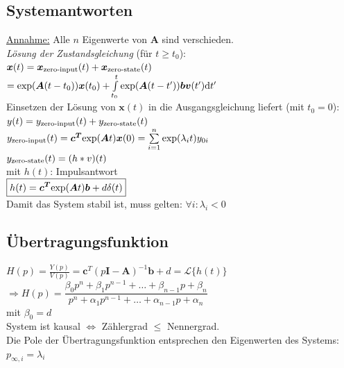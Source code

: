 \documentclass[a4paper,landscape,6pt]{article}
\newcommand{\ma}[1]{\ensuremath{\boldsymbol {#1}}}								%
\renewcommand{\vec}[1]{\ensuremath{\boldsymbol {#1}}}							%
\newcommand{\ul}[1]{\underline{#1}}
\begin{document}
\begin{multicols}{3}
\begin{tabular}{ll}
\end{tabular}

\subsection*{Systemantworten}
\ul{Annahme:} Alle $n$ Eigenwerte von $\ma A$ sind verschieden.\\

\textit{Lösung der Zustandsgleichung} (für $t \ge t_0$):\\
$\vec x (t) =  \vec x_{\textmd{zero-input}}(t) + \vec x_{\textmd{zero-state}}(t)$ \\
$= \textmd{exp}(\ma A (t-t_0)) \vec x (t_0) + \int\limits_{t_0}^t \textmd{exp}(\ma A(t-t')) \vec b \vec v(t') \mathrm{d}t'$\\

Einsetzen der Lösung von $\vec x(t)$ in die Ausgangsgleichung liefert (mit $t_0 = 0$):\\
$y(t) = y_{\textmd{zero-input}}(t) + y_{\textmd{zero-state}}(t)$\\
$y_{\textmd{zero-input}}(t) = \ma{c^T} \textmd{exp}(\ma A t) \vec x (0) = \sum\limits_{i=1}^{n} \textmd{exp}(\lambda_i t) y_{0i}$\\
$y_{\textmd{zero-state}}(t) = (h*v)(t)$\\

mit $h(t)$: Impulsantwort\\
$\boxed{h(t) = \vec c^{\ma T} \textmd{exp}(\ma A t) \vec b + d\delta(t)}$\\

Damit das System stabil ist, muss gelten: $\forall i : \lambda_i < 0$\\

\subsection*{Übertragungsfunktion}
$H(p) = \frac{Y(p)}{V(p)} = \ma{c}^T (p\ma{I} - \ma{A})^{-1} \ma{b} + d = \mathcal{L}\{h(t)\}$\\

$\Rightarrow \boxed{H(p) = \dfrac{\beta_0 p^n + \beta_1 p^{n-1} + \dots + \beta_{n-1} p + \beta_n}{p^n + \alpha_1 p^{n-1} + \dots + \alpha_{n-1} p + \alpha_n}}$ \\

mit $\beta_0 = d$\\
System ist kausal $\Leftrightarrow$ Zählergrad $\le$ Nennergrad.\\
Die Pole der Übertragungsfunktion entsprechen den Eigenwerten des Systems: $p_{\infty,i} = \lambda_i$

\end{multicols}
\end{document}
